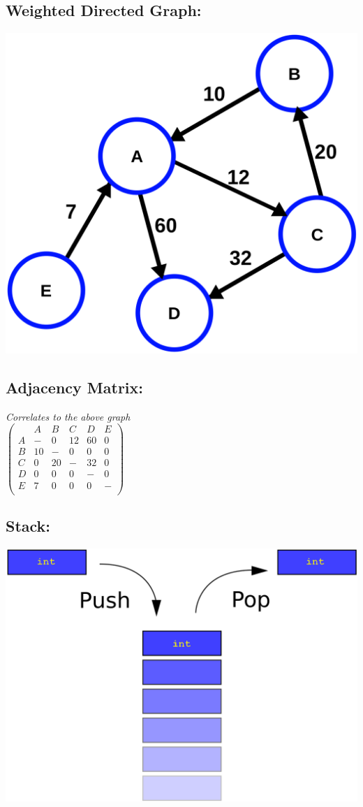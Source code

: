 	\subsection{Weighted Directed Graph:}
	\begin{center}
		\includegraphics[scale=0.2]{4/weighted_graph.png}
	\end{center}
	\subsection{Adjacency Matrix:}
	\begin{center}
		\emph{Correlates to the above graph} \\[5mm]
		$\begin{pmatrix}
			  & A & B & C & D & E\\
			A & - & 0 & 12 & 60 & 0\\
			B & 10 & - & 0 & 0 & 0\\
			C & 0 & 20 & - & 32 & 0\\
			D & 0 & 0 & 0 & - & 0\\
			E & 7 & 0 & 0 & 0 & -\\
		\end{pmatrix}$
	\end{center}
	\subsection{Stack:}
	\begin{center}
		\includegraphics[scale=0.3]{4/stack-int.png}
	\end{center}
